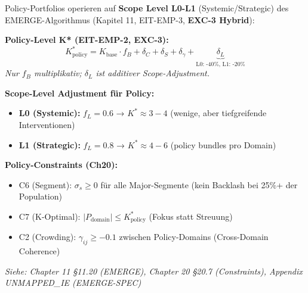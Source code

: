 \begin{tcolorbox}[colback=blue!5!white, colframe=blue!75!black,
    title=\textbf{Cross-Reference: EMERGE Algorithm \& Policy-Level K* (Chapter 11, 20)}]

Policy-Portfolios operieren auf \textbf{Scope Level L0-L1} (Systemic/Strategic) des EMERGE-Algorithmus (Kapitel 11, EIT-EMP-3, \textbf{EXC-3 Hybrid}):

\vspace{0.2cm}
\textbf{Policy-Level K* (EIT-EMP-2, EXC-3):}
\begin{equation*}
K^*_{\text{policy}} = K_{\text{base}} \cdot f_B + \delta_C + \delta_S + \delta_\gamma + \underbrace{\delta_L}_{\text{L0: -40\%, L1: -20\%}}
\end{equation*}
\textit{Nur $f_B$ multiplikativ; $\delta_L$ ist additiver Scope-Adjustment.}

\textbf{Scope-Level Adjustment für Policy:}
\begin{itemize}[nosep]
\item \textbf{L0 (Systemic):} $f_L = 0.6$ → $K^* \approx 3-4$ (wenige, aber tiefgreifende Interventionen)
\item \textbf{L1 (Strategic):} $f_L = 0.8$ → $K^* \approx 4-6$ (policy bundles pro Domain)
\end{itemize}

\vspace{0.2cm}
\textbf{Policy-Constraints (Ch20):}
\begin{itemize}[nosep]
\item C6 (Segment): $\sigma_s \geq 0$ für alle Major-Segmente (kein Backlash bei 25\%+ der Population)
\item C7 (K-Optimal): $|P_{\text{domain}}| \leq K^*_{\text{policy}}$ (Fokus statt Streuung)
\item C2 (Crowding): $\gamma_{ij} \geq -0.1$ zwischen Policy-Domains (Cross-Domain Coherence)
\end{itemize}

\vspace{0.2cm}
\textit{Siehe: Chapter 11 §11.20 (EMERGE), Chapter 20 §20.7 (Constraints), Appendix UNMAPPED_IE (EMERGE-SPEC)}
\end{tcolorbox}


